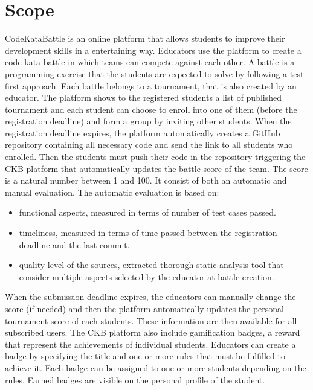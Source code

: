 \section{Scope}
CodeKataBattle is an online platform that allows students to improve their development skills in a entertaining way. \newline
Educators use the platform to create a code kata battle in which teams can compete against each other. A battle is a programming exercise that the students are expected to solve by following a test-first approach. Each battle belongs to a tournament, that is also created by an educator.
The platform shows to the registered students a list of published tournament and each student can choose to enroll into one of them (before the registration deadline) and form a group by inviting other students. \newline
When the registration deadline expires, the platform automatically creates a GitHub repository containing all necessary code and send the link to all students who enrolled. 
Then the students must push their code in the repository triggering the CKB platform that automatically updates the battle score of the team. \newline
The score is a natural number between 1 and 100. It consist of both an automatic and manual evaluation.  
The automatic evaluation is based on:
\begin{itemize}
    \item functional aspects, measured in terms of number of test cases passed.
    \item timeliness, measured in terms of time passed between the registration deadline and the last commit.
    \item quality level of the sources, extracted thorough static analysis tool that consider multiple aspects selected by the educator at battle creation.
\end{itemize}
When the submission deadline expires, the educators can manually change the score (if needed) and then the platform automatically updates the personal tournament score of each students. These information are then available for all subscribed users. \newline
The CKB platform also include gamification badges, a reward that represent the achievements of individual students. Educators can create a badge by specifying the title and one or more rules that must be fulfilled to achieve it. Each badge can be assigned to one or more students depending on the rules. Earned badges are visible on the personal profile of the student.

